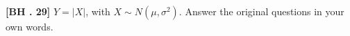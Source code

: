 \begin{exercise}
	\textbf{[BH . 29]}  $Y=|X|$, with $X \sim  {N}\left(\mu, \sigma^2\right)$. Answer the original questions in your own words.
\end{exercise}

